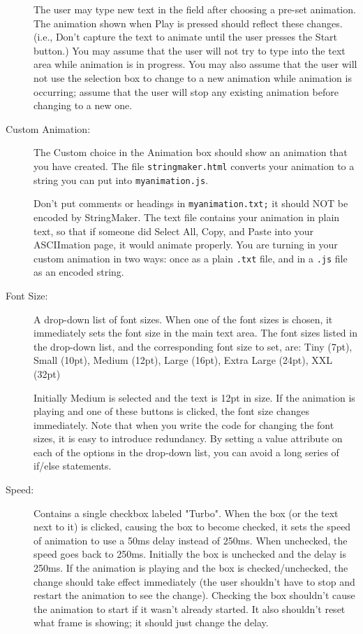 \documentclass{article}
\begin{document}
\begin{description}
The user may type new text in the field after choosing a pre-set
animation.  The animation shown when Play is pressed should reflect
these changes.  (i.e., Don't capture the text to animate until the
user presses the Start button.)  You may assume that the user will not
try to type into the text area while animation is in progress.  You
may also assume that the user will not use the selection box to change
to a new animation while animation is occurring; assume that the user
will stop any existing animation before changing to a new one.

\item[Custom Animation:] The Custom choice in the Animation box should
  show an animation that you have created.  The file {\tt stringmaker.html}
    converts your animation to a string you can put into
  {\tt myanimation.js}.

  Don't put comments or headings in {\tt myanimation.txt;} it should
  NOT be encoded by StringMaker.  The text file contains your
  animation in plain text, so that if someone did Select All, Copy,
  and Paste into your ASCIImation page, it would animate properly.
  You are turning in your custom animation in two ways: once as a
  plain {\tt .txt} file, and in a {\tt .js} file as an encoded string.

\item[Font Size:] A drop-down list of font sizes. When one of the font
  sizes is chosen, it immediately sets the font size in the main text
  area.  The font sizes listed in the drop-down list, and the
  corresponding font size to set, are: Tiny (7pt), Small (10pt),
  Medium (12pt), Large (16pt), Extra Large (24pt), XXL (32pt)

  Initially Medium is selected and the text is 12pt in size. If the
  animation is playing and one of these buttons is clicked, the font
  size changes immediately.  Note that when you write the code for
  changing the font sizes, it is easy to introduce redundancy.  By
  setting a value attribute on each of the options in the drop-down
  list, you can avoid a long series of if/else statements.

\item[Speed:] Contains a single checkbox labeled "Turbo".  When the
  box (or the text next to it) is clicked, causing the box to become
  checked, it sets the speed of animation to use a 50ms delay instead
  of 250ms.  When unchecked, the speed goes back to 250ms.  Initially
  the box is unchecked and the delay is 250ms.  If the animation is
  playing and the box is checked/unchecked, the change should take
  effect immediately (the user shouldn't have to stop and restart the
  animation to see the change).  Checking the box shouldn't cause the
  animation to start if it wasn't already started.  It also shouldn't
  reset what frame is showing; it should just change the delay.


\end{description}
\end{document}
